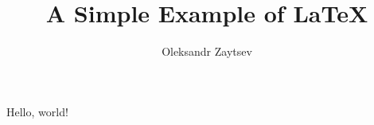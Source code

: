 \documentclass{article}
\begin{document}
\title{A Simple Example of LaTeX}
\author{Oleksandr Zaytsev}

\maketitle

Hello, world!
\end{document}
